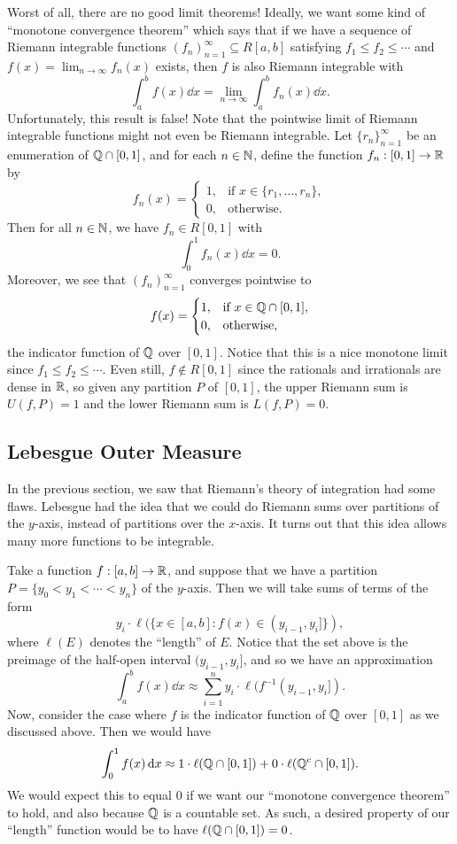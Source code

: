 Worst of all, there are no good limit theorems! Ideally, we want some kind of 
``monotone convergence theorem'' which says that if we have a sequence of 
Riemann integrable functions $(f_n)_{n=1}^\infty \subseteq R[a, b]$ satisfying 
$f_1 \leq f_2 \leq \cdots$ and $f(x) = 
\lim_{n\to\infty} f_n(x)$ exists, then $f$ is also Riemann integrable with 
\[ \int_a^b f(x)\dd x = \lim_{n\to\infty} \int_a^b f_n(x)\dd x. \] 
Unfortunately, this result is false! Note that the pointwise limit of Riemann 
integrable functions might not even be Riemann integrable. Let 
$\{r_n\}_{n=1}^\infty$ be an enumeration of $\mathbb{Q} \cap [0, 1]$, and for each 
$n \in \mathbb{N}$, define the function $f_n : [0, 1] \to \mathbb{R}$ by 
\[ f_n(x) = \begin{cases}
    1, & \text{if } x \in \{r_1, \dots, r_n\}, \\ 
    0, & \text{otherwise.} 
\end{cases} \] 
Then for all $n \in \mathbb{N}$, we have $f_n \in R[0, 1]$ with 
\[ \int_0^1 f_n(x)\dd x = 0. \] 
Moreover, we see that $(f_n)_{n=1}^\infty$ converges pointwise to 
\[ f(x) = \begin{cases} 
    1, & \text{if } x \in \mathbb{Q} \cap [0, 1], \\ 
    0, & \text{otherwise,} 
\end{cases} \] 
the indicator function of $\mathbb{Q}$ over $[0, 1]$. Notice that this is a nice 
monotone limit since $f_1 \leq f_2 \leq \cdots$. Even still, $f \notin R[0, 1]$
since the rationals and irrationals are dense in $\mathbb{R}$, so given any 
partition $P$ of $[0, 1]$, the upper Riemann sum is $U(f, P) = 1$ and 
the lower Riemann sum is $L(f, P) = 0$. 

\subsection{Lebesgue Outer Measure}\label{subsec:2.2}
In the previous section, we saw that Riemann's theory of integration had 
some flaws. Lebesgue had the idea that we could do Riemann sums over 
partitions of the $y$-axis, instead of partitions over the $x$-axis. It turns 
out that this idea allows many more functions to be integrable. 

Take a function $f : [a, b] \to \mathbb{R}$, and suppose that we have a partition 
$P = \{y_0 < y_1 < \cdots < y_n\}$ of the $y$-axis. Then we will take sums of 
terms of the form 
\[ y_i \cdot \ell(\{x \in [a, b] : f(x) \in (y_{i-1}, y_i]\}), \] 
where $\ell(E)$ denotes the ``length'' of $E$. Notice that the set above 
is the preimage of the half-open interval $(y_{i-1}, y_i]$, and so we have an 
approximation 
\[ \int_a^b f(x)\dd x \approx \sum_{i=1}^n y_i \cdot \ell(f^{-1}(y_{i-1}, y_i]). \] 
Now, consider the case where $f$ is the indicator function of $\mathbb{Q}$ over 
$[0, 1]$ as we discussed above. Then we would have 
\[ \int_0^1 f(x)\,\mathrm{d} x \approx 1 \cdot \ell(\mathbb{Q} \cap [0, 1]) + 0 \cdot 
\ell(\mathbb{Q}^c \cap [0, 1]). \] 
We would expect this to equal $0$ if we want our ``monotone convergence theorem''
to hold, and also because $\mathbb{Q}$ is a countable set. As such, a desired property 
of our ``length'' function would be to have $\ell(\mathbb{Q} \cap [0, 1]) = 0$. 


